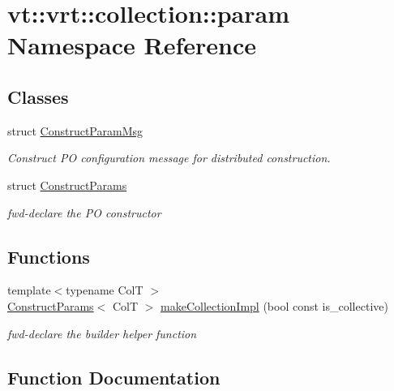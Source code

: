 \hypertarget{namespacevt_1_1vrt_1_1collection_1_1param}{}\section{vt\+:\+:vrt\+:\+:collection\+:\+:param Namespace Reference}
\label{namespacevt_1_1vrt_1_1collection_1_1param}
\subsection*{Classes}
\begin{DoxyCompactItemize}
\item 
struct \hyperlink{structvt_1_1vrt_1_1collection_1_1param_1_1_construct_param_msg}{Construct\+Param\+Msg}
\begin{DoxyCompactList}\small\item\em Construct PO configuration message for distributed construction. \end{DoxyCompactList}\item 
struct \hyperlink{structvt_1_1vrt_1_1collection_1_1param_1_1_construct_params}{Construct\+Params}
\begin{DoxyCompactList}\small\item\em fwd-\/declare the PO constructor \end{DoxyCompactList}\end{DoxyCompactItemize}
\subsection*{Functions}
\begin{DoxyCompactItemize}
\item 
{\footnotesize template$<$typename ColT $>$ }\\\hyperlink{structvt_1_1vrt_1_1collection_1_1param_1_1_construct_params}{Construct\+Params}$<$ ColT $>$ \hyperlink{namespacevt_1_1vrt_1_1collection_1_1param_aa623291c7682fd58f67c03a5b509988b}{make\+Collection\+Impl} (bool const is\+\_\+collective)
\begin{DoxyCompactList}\small\item\em fwd-\/declare the builder helper function \end{DoxyCompactList}\end{DoxyCompactItemize}


\subsection{Function Documentation}
\mbox{\label{namespacevt_1_1vrt_1_1collection_1_1param_aa623291c7682fd58f67c03a5b509988b}} 
